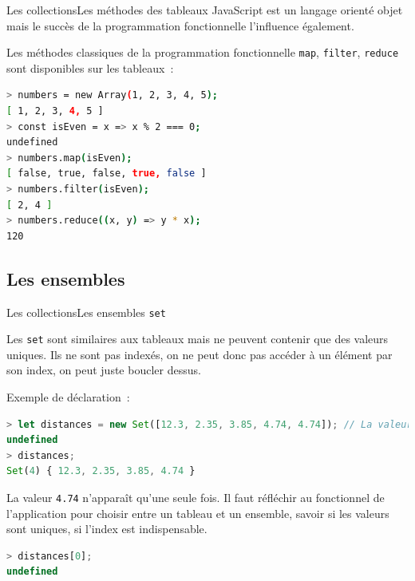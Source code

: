 \documentclass{beamer}
\begin{document}
    \begin{frame}[fragile]{Les collections}{Les méthodes des tableaux}
        JavaScript est un langage orienté objet mais le succès de la programmation fonctionnelle l'influence également.

        Les méthodes classiques de la programmation fonctionnelle \lstinline{map}, \lstinline{filter}, \lstinline{reduce} sont disponibles sur les tableaux~:
        \begin{lstlisting}[language=Bash,title={\tiny{Node.js}}]
> numbers = new Array(1, 2, 3, 4, 5);
[ 1, 2, 3, 4, 5 ]
> const isEven = x => x % 2 === 0;
undefined
> numbers.map(isEven);
[ false, true, false, true, false ]
> numbers.filter(isEven);
[ 2, 4 ]
> numbers.reduce((x, y) => y * x);
120
        \end{lstlisting}
    \end{frame}

    \subsection{Les ensembles}\label{subsec:set}
    \begin{frame}[fragile]{Les collections}{Les ensembles \lstinline{set}}
        \begin{footnotesize}
            Les \lstinline{set} sont similaires aux tableaux mais ne peuvent contenir que des valeurs uniques.
            Ils ne sont pas indexés, on ne peut donc pas accéder à un élément par son index, on peut juste boucler dessus.

            Exemple de déclaration~:
            \begin{lstlisting}[language=JavaScript,title={\tiny{Script JavaScript}}]
> let distances = new Set([12.3, 2.35, 3.85, 4.74, 4.74]); // La valeur en double va disparaître
undefined
> distances;
Set(4) { 12.3, 2.35, 3.85, 4.74 }
            \end{lstlisting}
            La valeur \lstinline{4.74} n'apparaît qu'une seule fois.
            \bigbreak
            Il faut réfléchir au fonctionnel de l'application pour choisir entre un tableau et un ensemble, savoir si les valeurs sont uniques, si l'index est indispensable.
            \begin{lstlisting}[language=JavaScript,title={\tiny{Script JavaScript}}]
> distances[0];
undefined
            \end{lstlisting}
        \end{footnotesize}
    \end{frame}
\end{document}
